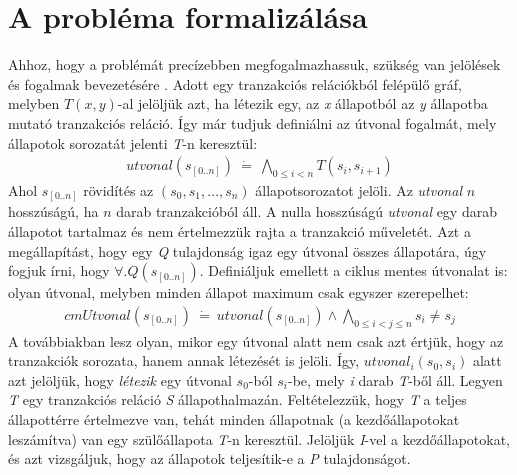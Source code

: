\section{A probléma formalizálása}
\label{sec:problema_form}

Ahhoz, hogy a problémát precízebben megfogalmazhassuk, szükség van jelölések és fogalmak bevezetésére \cite{k_induction_article}. Adott egy tranzakciós relációkból felépülő gráf, melyben $T(x, y)$-al jelöljük azt, ha létezik egy, az \emph{x} állapotból az \emph{y} állapotba mutató tranzakciós reláció. Így már tudjuk definiálni az útvonal fogalmát, mely állapotok sorozatát jelenti \emph{T}-n keresztül:
\begin{align}
	utvonal(s_{[0..n]})~\dot{=}~\bigwedge_{0 \leq i < n} T(s_{i}, s_{i+1})
\end{align}
Ahol $s_{[0..n]}$ rövidítés az $(s_{0}, s_{1}, \dots, s_{n})$ állapotsorozatot jelöli. Az \emph{utvonal} $n$ hosszúságú, ha $n$ darab tranzakcióból áll. A nulla hosszúságú \emph{utvonal} egy darab állapotot tartalmaz és nem értelmezzük rajta a tranzakció műveletét. Azt a megállapítást, hogy egy \emph{Q} tulajdonság igaz egy útvonal összes állapotára, úgy fogjuk írni, hogy $\forall . Q(s_{[0..n]})$.
\newline
\newline
Definiáljuk emellett a ciklus mentes útvonalat is: olyan útvonal, melyben minden állapot maximum csak egyszer szerepelhet:
\begin{align}
	cmUtvonal(s_{[0..n]})~\dot{=}~utvonal(s_{[0..n]}) \wedge \bigwedge_{0 \leq i < j \leq n} s_{i} \neq s_{j}
\end{align}
A továbbiakban lesz olyan, mikor egy útvonal alatt nem csak azt értjük, hogy az tranzakciók sorozata, hanem annak létezését is jelöli. Így, $utvonal_{i}(s_{0}, s_{i})$ alatt azt jelöljük, hogy \emph{létezik} egy útvonal $s_{0}$-ból $s_{i}$-be, mely \emph{i} darab \emph{T}-ből áll.
\newline
\newline
Legyen \emph{T} egy tranzakciós reláció \emph{S} állapothalmazán. Feltételezzük, hogy \emph{T} a teljes állapottérre értelmezve van, tehát minden állapotnak (a kezdőállapotokat leszámítva) van egy szülőállapota \emph{T}-n keresztül. Jelöljük \emph{I}-vel a kezdőállapotokat, és azt vizsgáljuk, hogy az állapotok teljesítik-e a \emph{P} tulajdonságot.

